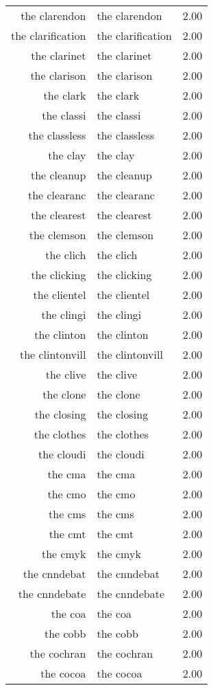 \begin{table}[ht]
\begin{tabular}{rlr}
  the clarendon & the clarendon & 2.00 \\ 
  the clarification & the clarification & 2.00 \\ 
  the clarinet & the clarinet & 2.00 \\ 
  the clarison & the clarison & 2.00 \\ 
  the clark & the clark & 2.00 \\ 
  the classi & the classi & 2.00 \\ 
  the classless & the classless & 2.00 \\ 
  the clay & the clay & 2.00 \\ 
  the cleanup & the cleanup & 2.00 \\ 
  the clearanc & the clearanc & 2.00 \\ 
  the clearest & the clearest & 2.00 \\ 
  the clemson & the clemson & 2.00 \\ 
  the clich & the clich & 2.00 \\ 
  the clicking & the clicking & 2.00 \\ 
  the clientel & the clientel & 2.00 \\ 
  the clingi & the clingi & 2.00 \\ 
  the clinton & the clinton & 2.00 \\ 
  the clintonvill & the clintonvill & 2.00 \\ 
  the clive & the clive & 2.00 \\ 
  the clone & the clone & 2.00 \\ 
  the closing & the closing & 2.00 \\ 
  the clothes & the clothes & 2.00 \\ 
  the cloudi & the cloudi & 2.00 \\ 
  the cma & the cma & 2.00 \\ 
  the cmo & the cmo & 2.00 \\ 
  the cms & the cms & 2.00 \\ 
  the cmt & the cmt & 2.00 \\ 
  the cmyk & the cmyk & 2.00 \\ 
  the cnndebat & the cnndebat & 2.00 \\ 
  the cnndebate & the cnndebate & 2.00 \\ 
  the coa & the coa & 2.00 \\ 
  the cobb & the cobb & 2.00 \\ 
  the cochran & the cochran & 2.00 \\ 
  the cocoa & the cocoa & 2.00 \\ 

\end{tabular}
\end{table}
